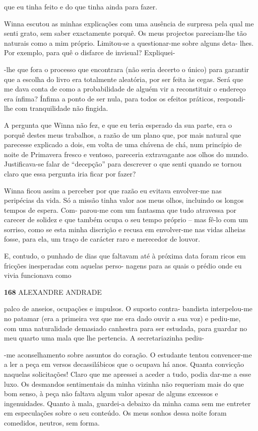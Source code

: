 que eu tinha feito e do que tinha ainda para fazer.

Winna escutou as minhas explicações com uma ausência de surpresa pela
qual me senti grato, sem saber exactamente porquê. Os meus projectos
pareciam-lhe tão naturais como a mim próprio. Limitou-se a questionar-me
sobre alguns deta- lhes. Por exemplo, para quê o disfarce de invisual?
Expliquei-

-lhe que fora o processo que encontrara (não seria decerto o único) para
garantir que a escolha do livro era totalmente aleatória, por ser feita
às cegas. Será que me dava conta de como a probabilidade de alguém vir a
reconstituir o endereço era ínfima? Ínfima a ponto de ser nula, para
todos os efeitos práticos, respondi-lhe com tranquilidade não fingida.

A pergunta que Winna não fez, e que eu teria esperado da sua parte, era
o porquê destes meus trabalhos, a razão de um plano que, por mais
natural que parecesse explicado a dois, em volta de uma chávena de chá,
num princípio de noite de Primavera fresco e ventoso, pareceria
extravagante aos olhos do mundo. Justificava-se falar de ``decepção''
para descrever o que senti quando se tornou claro que essa pergunta iria
ficar por fazer?

Winna ficou assim a perceber por que razão eu evitava envolver-me nas
peripécias da vida. Só a missão tinha valor aos meus olhos, incluindo os
longos tempos de espera. Com- parou-me com um fantasma que tudo
atravessa por carecer de solidez e que também ocupa o seu tempo próprio
-- mas fê-lo com um sorriso, como se esta minha discrição e recusa em
envolver-me nas vidas alheias fosse, para ela, um traço de carácter raro
e merecedor de louvor.

E, contudo, o punhado de dias que faltavam até à próxima data foram
ricos em fricções inesperadas com aquelas perso- nagens para as quais o
prédio onde eu vivia funcionava como

\textbf{168 }ALEXANDRE ANDRADE

palco de anseios, ocupações e impulsos. O suposto contra- bandista
interpelou-me no patamar (era a primeira vez que me era dado ouvir a sua
voz) e pediu-me, com uma naturalidade demasiado canhestra para ser
estudada, para guardar no meu quarto uma mala que lhe pertencia. A
secretariazinha pediu-

-me aconselhamento sobre assuntos do coração. O estudante tentou
convencer-me a ler a peça em versos decassilábicos que o ocupava há
anos. Quanta convicção naquelas solicitações! Claro que me apressei a
aceder a tudo, podia dar-me a esse luxo. Os desmandos sentimentais da
minha vizinha não requeriam mais do que bom senso, à peça não faltava
algum valor apesar de alguns excessos e ingenuidades. Quanto à mala,
guardei-a debaixo da minha cama sem me entreter em especulações sobre o
seu conteúdo. Os meus sonhos dessa noite foram comedidos, neutros, sem
forma.

